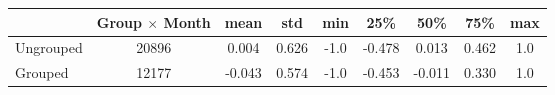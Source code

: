 \begin{tabular}{lcccccccc}
\toprule
{} &  Group $ \times $ Month &   mean &    std &  min &    25\% &    50\% &    75\% &  max \\
\midrule
Ungrouped &                 20896 &  0.004 &  0.626 & -1.0 & -0.478 &  0.013 &  0.462 &  1.0 \\
Grouped   &                 12177 & -0.043 &  0.574 & -1.0 & -0.453 & -0.011 &  0.330 &  1.0 \\
\bottomrule
\end{tabular}
